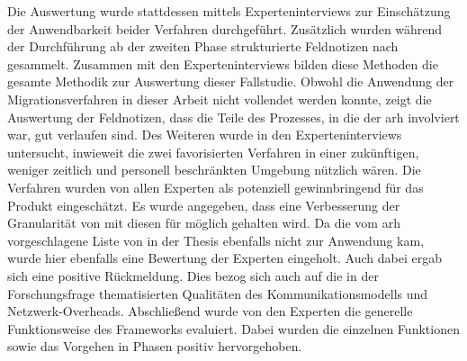 Die Auswertung wurde stattdessen mittels Experteninterviews zur Einschätzung der Anwendbarkeit beider Verfahren durchgeführt.
Zusätzlich wurden während der Durchführung ab der zweiten Phase strukturierte Feldnotizen nach  gesammelt.
Zusammen mit den Experteninterviews bilden diese Methoden die gesamte Methodik zur Auswertung dieser Fallstudie.
Obwohl die Anwendung der Migrationsverfahren in dieser Arbeit nicht vollendet werden konnte, zeigt die Auswertung der Feldnotizen, dass die Teile des Prozesses, in die der \gls{arh} involviert war, gut verlaufen sind.
Des Weiteren wurde in den Experteninterviews untersucht, inwieweit die zwei favorisierten Verfahren in einer zukünftigen, weniger zeitlich und personell beschränkten Umgebung nützlich wären.
Die Verfahren wurden von allen Experten als potenziell gewinnbringend für das Produkt eingeschätzt.
Es wurde angegeben, dass eine Verbesserung der Granularität von \jf mit diesen für möglich gehalten wird.
Da die vom \gls{arh} vorgeschlagene Liste von \bpp in der Thesis ebenfalls nicht zur Anwendung kam, wurde hier ebenfalls eine Bewertung der Experten eingeholt.
Auch dabei ergab sich eine positive Rückmeldung.
Dies bezog sich auch auf die in der Forschungsfrage thematisierten Qualitäten des Kommunikationsmodells und Netzwerk-Overheads.
Abschließend wurde von den Experten die generelle Funktionsweise des Frameworks evaluiert. 
Dabei wurden die einzelnen Funktionen sowie das Vorgehen in Phasen positiv hervorgehoben.
%

